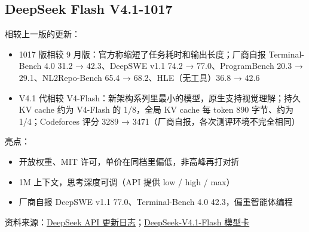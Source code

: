 \documentclass[11pt,a4paper,fontset=none]{ctexart}
\begin{document}
\subsection*{DeepSeek Flash V4.1-1017}
\begin{center}\small
{}
\end{center}
相较上一版的更新：
\begin{itemize}
\item 1017 版相较 9 月版：官方称缩短了任务耗时和输出长度；厂商自报 Terminal-Bench 4.0 31.2 → 42.3、DeepSWE v1.1 74.2 → 77.0、ProgramBench 20.3 → 29.1、NL2Repo-Bench 65.4 → 68.2、HLE（无工具）36.8 → 42.6
\item V4.1 代相较 V4-Flash：新架构系列里最小的模型，原生支持视觉理解；持久 KV cache 约为 V4-Flash 的 1/8，全局 KV cache 每 token 890 字节、约为 1/4；Codeforces 评分 3289 → 3471（厂商自报，各次测评环境不完全相同）
\end{itemize}
亮点：
\begin{itemize}
\item 开放权重、MIT 许可，单价在同档里偏低，非高峰再打对折
\item 1M 上下文，思考深度可调（API 提供 low / high / max）
\item 厂商自报 DeepSWE v1.1 77.0、Terminal-Bench 4.0 42.3，偏重智能体编程
\end{itemize}
{\small 资料来源：\href{https://api-docs.deepseek.com/updates/}{DeepSeek API 更新日志}；\href{https://huggingface.co/deepseek-ai/DeepSeek-V4.1-Flash}{DeepSeek-V4.1-Flash 模型卡}}
\end{document}
